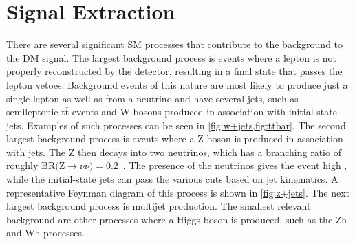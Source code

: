 \chapter{Signal Extraction}
There are several significant SM processes that contribute to the background to the DM signal. 
The largest background process is events where a lepton is not properly reconstructed by the detector, resulting in a final state that passes the lepton vetoes. Background events of this nature are most likely to produce just a single lepton as well as \ptmiss from a neutrino and have several jets, such as semileptonic t$\bar{\mathrm{t}}$ events and W bosons produced in association with initial state jets. Examples of such processes can be seen in \cref{fig:w+jets,fig:ttbar}.  
The second largest background process is events where a Z boson is produced in association with jets. The Z then decays into two neutrinos, which has a branching ratio of roughly $\text{BR(Z}\to\nu\nu) = 0.2$~\cite{Zyla:2020zbs}. The presence of the neutrinos gives the event high \ptmiss, while the initial-state jets can pass the various cuts based on jet kinematics. A representative Feynman diagram of this process is shown in \cref{fig:z+jets}.
The next largest background process is multijet production.
The smallest relevant background are other processes where a Higgs boson is produced, such as the Zh and Wh processes.

